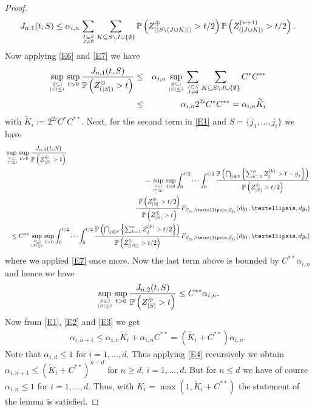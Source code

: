 \documentclass[aos]{imsart}
\numberwithin{equation}{section}
\theoremstyle{plain} %
\theoremstyle{remark}
\newcommand{\beao}{\begin{eqnarray*}}
\newcommand{\eeao}{\end{eqnarray*}\noindent}
\newcommand{\beam}{\begin{eqnarray}}
\newcommand{\eeam}{\end{eqnarray}\noindent}
\renewcommand\P{\mathbb{P}}
\begin{document}
\begin{proof}
    \beao
        J_{n,1}(t,S)
            \leq \alpha_{i,n}\sum_{\genfrac{}{}{0pt}{}{J\subseteq S}{J\not=\emptyset} }\sum_{K\subseteq S\backslash J\cup\{\emptyset\}}
            \P\left( Z_{(|S\backslash (J\cup K)|)}^{\oplus}>t/2\right)
                \P\left(Z_{(|J\cup K|)}^{(n+1)}>t/2\right).
    \eeao
    Now applying  \eqref{E6} and \eqref{E7} we have
    \beam \label{E2}
        \sup_{\genfrac{}{}{0pt}{}{S\subseteq \mathbb{I}}{ |S|\leq i }}\sup_{t>0}\frac{J_{n,1}(t,S)}{\P\left(Z_{(|S|)}^{\oplus}>t\right)}&\leq& \alpha_{i,n}\sup_{\genfrac{}{}{0pt}{}{S\subseteq \mathbb{I}}{ |S|\leq i }}\sum_{\genfrac{}{}{0pt}{}{J\subseteq S}{J\not=\emptyset} }\sum_{K\subseteq S\backslash J\cup\{\emptyset\}}C^*C^{**} \nonumber\\
        &\leq & \alpha_{i,n} 2^{2i} C^*C^{**} =\alpha_{i,n}\widetilde K_i
    \eeam
    with $\widetilde K_i:=2^{2i}C^*C^{**} $.
    Next, for the second term in \eqref{E1} and $S=\{j_1,\ldots,j_i\}$ we have
    \beao
        \lefteqn{\sup_{\genfrac{}{}{0pt}{}{S\subseteq \mathbb{I}}{ |S|\leq i }}\sup_{t>0}\frac{J_{n,2}(t,S)}{\P\left(Z_{|S|}^{\oplus}>t\right)}} \nonumber\\
            &&=\sup_{\genfrac{}{}{0pt}{}{S\subseteq \mathbb{I}}{ |S|\leq i }}\sup_{t>0}\int_0^{t/2}\cdots\int_0^{t/2}
            \frac{\P\left(\bigcap_{j\in S}\left\{\sum_{k=1}^{n} Z^{(k)}_j>t-y_j\right\}\right)}{\P\left(Z_{|S|}^{\oplus}>t/2\right)}\nonumber\\
            &&\quad \quad\qquad\qquad \cdot\frac{\P\left(Z_{|S|}^{\oplus}>t/2\right)}{\P\left(Z_{|S|}^{\oplus}>t\right)}F_{Z_{j_1},\ldots,Z_{j_i}}(dy_1,\ldots,dy_i) \nonumber\\
            &&\leq C^{**}\sup_{\genfrac{}{}{0pt}{}{S\subseteq \mathbb{I}}{ |S|\leq i }}\sup_{t>0}\int_0^{t/2}\cdots\int_0^{t/2}
            \frac{\P\left(\bigcap_{j\in S}\left\{ \sum_{k=1}^{n} Z^{(k)}_j>t/2\right\}\right)}{\P\left(Z_{(|S|)}^{\oplus}>t/2\right)}F_{Z_{j_1},\ldots,Z_{j_i}}(dy_1,\ldots,dy_i)            \nonumber
    \eeao
    where we applied \eqref{E7} once more. Now the last term above is bounded by $C^{**} \alpha_{i,n}$ and hence we have
    \beam \label{E3}
        \sup_{\genfrac{}{}{0pt}{}{S\subseteq \mathbb{I}}{ |S|\leq i} }\sup_{t>0}\frac{J_{n,2}(t,S)}{\P\left(Z_{|S|}^{\oplus}>t\right)}\leq C^{**} \alpha_{i,n}.
    \eeam 
    Now from
    \eqref{E1}, \eqref{E2} and \eqref{E3} we get
    \beam \label{E4}
        \alpha_{i,n+1}\leq \alpha_{i,n}\widetilde K_i+\alpha_{i,n} C^{**}= (\widetilde K_i+C^{**})\alpha_{i,n}.
    \eeam
    Note that  $\alpha_{i,d}\leq 1$ for $i=1,\ldots,d$. Thus applying  \eqref{E4} recursively we obtain \linebreak $\alpha_{i,n+1}\leq (\widetilde K_i+C^{**})^{{n-d}}$ for $n\geq d$, $i=1,\ldots,d$. But for $n\leq d$
we have of course $\alpha_{i,n}\leq 1$ for $i=1,\ldots,d$. Thus, with $K_i=\max(1,\widetilde K_i+C^{**})$  the statement of the lemma is satisfied.
\end{proof}
\end{document}
